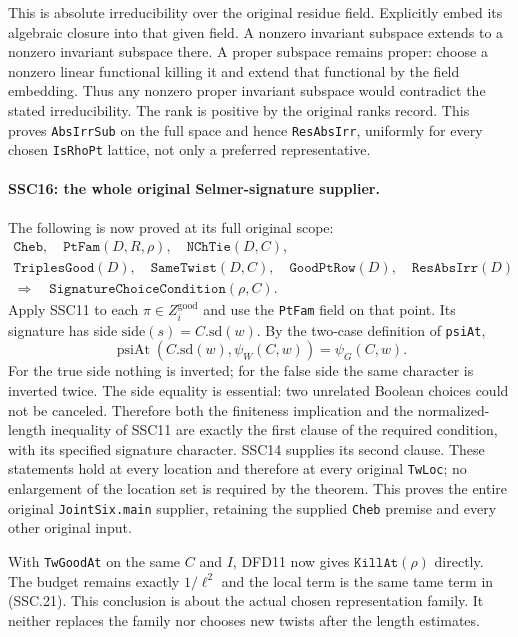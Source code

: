 This is absolute irreducibility over the original residue field.
Explicitly embed its algebraic closure into that given field.
A nonzero invariant subspace extends to a nonzero invariant
subspace there. A proper subspace remains proper: choose a
nonzero linear functional killing it and extend that functional
by the field embedding. Thus any nonzero proper invariant subspace
would contradict the stated irreducibility. The rank is positive
by the original ranks record. This proves \texttt{AbsIrrSub} on the
full space and hence \texttt{ResAbsIrr}, uniformly for every chosen
\texttt{IsRhoPt} lattice, not only a preferred representative.

\paragraph{SSC16: the whole original Selmer-signature supplier.}
\label{claim:SSC16}
The following is now proved at its full original scope:
\[
\begin{gathered}
 \texttt{Cheb},\quad \texttt{PtFam}(D,R,\rho),\quad
 \texttt{NChTie}(D,C),\\
 \texttt{TriplesGood}(D),\quad\texttt{SameTwist}(D,C),\quad
 \texttt{GoodPtRow}(D),\quad\texttt{ResAbsIrr}(D)\\
 \Longrightarrow\quad
            \texttt{SignatureChoiceCondition}(\rho,C).        \tag{SSC.23}
\end{gathered}
\]
Apply SSC11 to each $\pi\in Z_i^{\mathrm{good}}$ and use the
\texttt{PtFam} field on that point. Its signature has side
$\mathrm{side}(s)=C.\mathrm{sd}(w)$. By the two-case definition
of \texttt{psiAt},
\[
 \operatorname{psiAt}(C.\mathrm{sd}(w),\psi_W(C,w))
                        =\psi_G(C,w).                         \tag{SSC.24}
\]
For the true side nothing is inverted; for the false side the
same character is inverted twice. The side equality is essential:
two unrelated Boolean choices could not be canceled. Therefore
both the finiteness implication and the normalized-length
inequality of SSC11 are exactly the first clause of the required
condition, with its specified signature character. SSC14 supplies
its second clause. These statements hold at every location and
therefore at every original \texttt{TwLoc}; no enlargement of the
location set is required by the theorem. This proves the entire
original \texttt{JointSix.main} supplier, retaining the supplied
\texttt{Cheb} premise and every other original input.

With \texttt{TwGoodAt} on the same $C$ and $I$, DFD11 now gives
$\texttt{KillAt}(\rho)$ directly. The budget remains exactly
$1/\ell^2$ and the local term is the same tame term in (SSC.21).
This conclusion is about the actual chosen representation family.
It neither replaces the family nor chooses new twists after
the length estimates.

